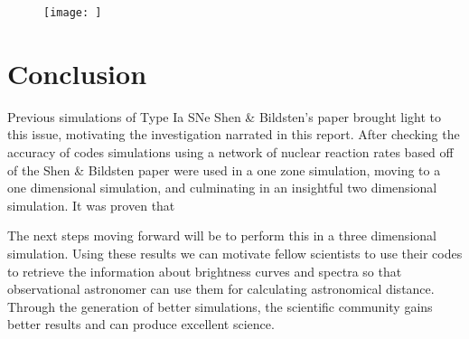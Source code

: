 \documentclass[11pt, oneside]{article}   	%
\begin{document}
      
      \begin{figure}
        \centering
        \texttt{[image: ]}
        \caption{}
        \label{fig:subchsims}
      \end{figure}
      
  
\section{Conclusion}
  
  Previous simulations of Type Ia SNe %
  Shen \& Bildsten's paper brought light to this issue, motivating the investigation narrated in this report. After checking the accuracy of codes simulations using a network of nuclear reaction rates based off of the Shen \& Bildsten paper were used in a one zone simulation, moving to a one dimensional simulation, and culminating in an insightful two dimensional simulation. It was proven that %
  
  The next steps moving forward will be to perform this in a three dimensional simulation. Using these results we can motivate fellow scientists to use their codes to retrieve the information about brightness curves and spectra so that observational astronomer can use them for calculating astronomical distance. Through the generation of better simulations, the scientific community gains better results and can produce excellent science. 
  
\end{document}
